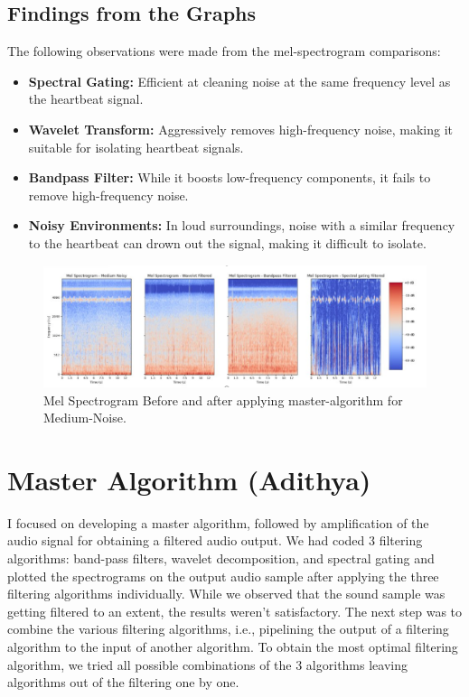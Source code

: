 \documentclass[conference]{IEEEtran}
\begin{document}
\subsection{Findings from the Graphs}
The following observations were made from the mel-spectrogram comparisons:
\begin{itemize}
    \item \textbf{Spectral Gating:} Efficient at cleaning noise at the same frequency level as the heartbeat signal.
    \item \textbf{Wavelet Transform:} Aggressively removes high-frequency noise, making it suitable for isolating heartbeat signals.
    \item \textbf{Bandpass Filter:} While it boosts low-frequency components, it fails to remove high-frequency noise.
    \item \textbf{Noisy Environments:} In loud surroundings, noise with a similar frequency to the heartbeat can drown out the signal, making it difficult to isolate.
\end{itemize}

\begin{figure}[h]
\centering
\includegraphics[width=0.8\linewidth]{Images/all methods mel spec.png}
\caption{Mel Spectrogram Before and after applying master-algorithm for Medium-Noise.}
\label{fig:mastermedium mel comparison}
\end{figure}




\section{Master Algorithm (Adithya)}
I focused on developing a master algorithm, followed by amplification of the audio signal for obtaining a filtered audio output. We had coded 3 filtering
algorithms: band-pass filters, wavelet decomposition, and spectral gating and plotted the spectrograms on the output
audio sample after applying the three filtering algorithms
individually. While we observed that the sound sample was
getting filtered to an extent, the results weren’t satisfactory.
The next step was to combine the various filtering algorithms,
i.e., pipelining the output of a filtering algorithm to the input
of another algorithm. To obtain the most optimal filtering algorithm, we tried all possible combinations of the 3 algorithms
leaving algorithms out of the filtering one by one.
\end{document}
